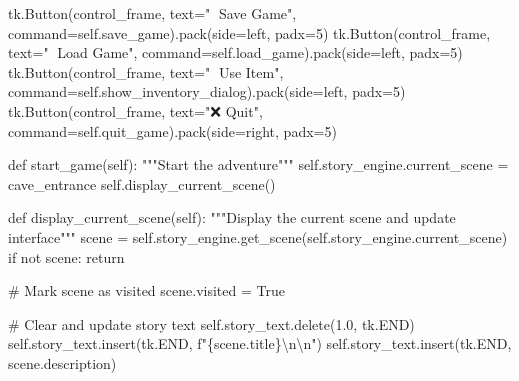 \documentclass[
  letterpaper,
  DIV=11,
  numbers=noendperiod,
  oneside]{scrreprt}
\newenvironment{Shaded}{}{}
\newcommand{\CharTok}[1]{\textcolor[rgb]{0.01,0.18,0.38}{#1}}
\newcommand{\CommentTok}[1]{\textcolor[rgb]{0.42,0.45,0.49}{#1}}
\newcommand{\ControlFlowTok}[1]{\textcolor[rgb]{0.84,0.23,0.29}{#1}}
\newcommand{\DecValTok}[1]{\textcolor[rgb]{0.00,0.36,0.77}{#1}}
\newcommand{\FloatTok}[1]{\textcolor[rgb]{0.00,0.36,0.77}{#1}}
\newcommand{\KeywordTok}[1]{\textcolor[rgb]{0.84,0.23,0.29}{#1}}
\newcommand{\NormalTok}[1]{\textcolor[rgb]{0.14,0.16,0.18}{#1}}
\newcommand{\OperatorTok}[1]{\textcolor[rgb]{0.14,0.16,0.18}{#1}}
\newcommand{\SpecialCharTok}[1]{\textcolor[rgb]{0.00,0.36,0.77}{#1}}
\newcommand{\SpecialStringTok}[1]{\textcolor[rgb]{0.01,0.18,0.38}{#1}}
\newcommand{\StringTok}[1]{\textcolor[rgb]{0.01,0.18,0.38}{#1}}
\newcommand{\VariableTok}[1]{\textcolor[rgb]{0.89,0.38,0.04}{#1}}
\begin{document}
\begin{Shaded}
\begin{Highlighting}[]
\NormalTok{        tk.Button(control\_frame, text}\OperatorTok{=}\StringTok{"💾 Save Game"}\NormalTok{, }
\NormalTok{                 command}\OperatorTok{=}\VariableTok{self}\NormalTok{.save\_game).pack(side}\OperatorTok{=}\StringTok{\textquotesingle{}left\textquotesingle{}}\NormalTok{, padx}\OperatorTok{=}\DecValTok{5}\NormalTok{)}
\NormalTok{        tk.Button(control\_frame, text}\OperatorTok{=}\StringTok{"📁 Load Game"}\NormalTok{, }
\NormalTok{                 command}\OperatorTok{=}\VariableTok{self}\NormalTok{.load\_game).pack(side}\OperatorTok{=}\StringTok{\textquotesingle{}left\textquotesingle{}}\NormalTok{, padx}\OperatorTok{=}\DecValTok{5}\NormalTok{)}
\NormalTok{        tk.Button(control\_frame, text}\OperatorTok{=}\StringTok{"🎒 Use Item"}\NormalTok{, }
\NormalTok{                 command}\OperatorTok{=}\VariableTok{self}\NormalTok{.show\_inventory\_dialog).pack(side}\OperatorTok{=}\StringTok{\textquotesingle{}left\textquotesingle{}}\NormalTok{, padx}\OperatorTok{=}\DecValTok{5}\NormalTok{)}
\NormalTok{        tk.Button(control\_frame, text}\OperatorTok{=}\StringTok{"❌ Quit"}\NormalTok{, }
\NormalTok{                 command}\OperatorTok{=}\VariableTok{self}\NormalTok{.quit\_game).pack(side}\OperatorTok{=}\StringTok{\textquotesingle{}right\textquotesingle{}}\NormalTok{, padx}\OperatorTok{=}\DecValTok{5}\NormalTok{)}
    
    \KeywordTok{def}\NormalTok{ start\_game(}\VariableTok{self}\NormalTok{):}
        \CommentTok{"""Start the adventure"""}
        \VariableTok{self}\NormalTok{.story\_engine.current\_scene }\OperatorTok{=} \StringTok{\textquotesingle{}cave\_entrance\textquotesingle{}}
        \VariableTok{self}\NormalTok{.display\_current\_scene()}
    
    \KeywordTok{def}\NormalTok{ display\_current\_scene(}\VariableTok{self}\NormalTok{):}
        \CommentTok{"""Display the current scene and update interface"""}
\NormalTok{        scene }\OperatorTok{=} \VariableTok{self}\NormalTok{.story\_engine.get\_scene(}\VariableTok{self}\NormalTok{.story\_engine.current\_scene)}
        \ControlFlowTok{if} \KeywordTok{not}\NormalTok{ scene:}
            \ControlFlowTok{return}
        
        \CommentTok{\# Mark scene as visited}
\NormalTok{        scene.visited }\OperatorTok{=} \VariableTok{True}
        
        \CommentTok{\# Clear and update story text}
        \VariableTok{self}\NormalTok{.story\_text.delete(}\FloatTok{1.0}\NormalTok{, tk.END)}
        \VariableTok{self}\NormalTok{.story\_text.insert(tk.END, }\SpecialStringTok{f"}\SpecialCharTok{\{}\NormalTok{scene}\SpecialCharTok{.}\NormalTok{title}\SpecialCharTok{\}}\CharTok{\textbackslash{}n\textbackslash{}n}\SpecialStringTok{"}\NormalTok{)}
        \VariableTok{self}\NormalTok{.story\_text.insert(tk.END, scene.description)}
        

\end{Highlighting}
\end{Shaded}
\end{document}
